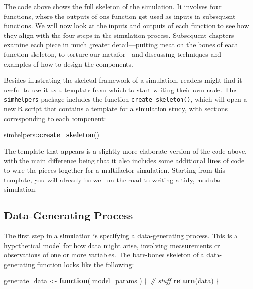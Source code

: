 \documentclass[
]{book}
\newenvironment{Shaded}{\begin{snugshade}}{\end{snugshade}}
\newcommand{\CommentTok}[1]{\textcolor[rgb]{0.56,0.35,0.01}{\textit{#1}}}
\newcommand{\ControlFlowTok}[1]{\textcolor[rgb]{0.13,0.29,0.53}{\textbf{#1}}}
\newcommand{\FunctionTok}[1]{\textcolor[rgb]{0.13,0.29,0.53}{\textbf{#1}}}
\newcommand{\NormalTok}[1]{#1}
\newcommand{\OtherTok}[1]{\textcolor[rgb]{0.56,0.35,0.01}{#1}}
\newcommand{\SpecialCharTok}[1]{\textcolor[rgb]{0.81,0.36,0.00}{\textbf{#1}}}
\begin{document}
The code above shows the full skeleton of the simulation.
It involves four functions, where the outputs of one function get used as inputs in subsequent functions.
We will now look at the inputs and outputs of each function to see how they align with the four steps in the simulation process.
Subsequent chapters examine each piece in much greater detail---putting meat on the bones of each function skeleton, to torture our metafor---and discussing techniques and examples of how to design the components.

Besides illustrating the skeletal framework of a simulation, readers might find it useful to use it as a template from which to start writing their own code.
The \texttt{simhelpers} package includes the function \texttt{create\_skeleton()}, which will open a new R script that contains a template for a simulation study, with sections corresponding to each component:

\begin{Shaded}
\begin{Highlighting}[]
\NormalTok{simhelpers}\SpecialCharTok{::}\FunctionTok{create\_skeleton}\NormalTok{()}
\end{Highlighting}
\end{Shaded}

The template that appears is a slightly more elaborate version of the code above, with the main difference being that it also includes some additional lines of code to wire the pieces together for a multifactor simulation.
Starting from this template, you will already be well on the road to writing a tidy, modular simulation.

\subsection{Data-Generating Process}\label{data-generating-process}

The first step in a simulation is specifying a data-generating process. This is a hypothetical model for how data might arise, involving measurements or observations of one or more variables. The bare-bones skeleton of a data-generating function looks like the following:

\begin{Shaded}
\begin{Highlighting}[]
\NormalTok{generate\_data }\OtherTok{\textless{}{-}} \ControlFlowTok{function}\NormalTok{( model\_params ) \{}
  \CommentTok{\# stuff}
  \FunctionTok{return}\NormalTok{(data)}
\NormalTok{\}}
\end{Highlighting}
\end{Shaded}
\end{document}
